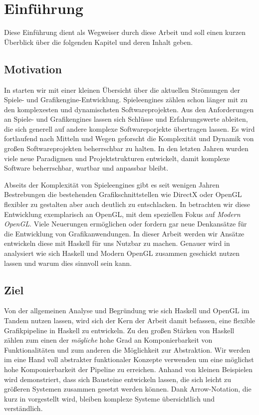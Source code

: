 \chapter{Einführung}

Diese Einführung dient als Wegweiser durch diese Arbeit und soll einen kurzen Überblick über die folgenden Kapitel und deren Inhalt geben.

\section{Motivation}
In  starten wir mit einer kleinen Übersicht über die aktuellen Strömungen der Spiele- und Grafikengine-Entwicklung. Spieleengines zählen schon länger mit zu den komplexesten und dynamischsten Softwareprojekten. Aus den Anforderungen an Spiele- und Grafikengines lassen sich Schlüsse und Erfahrungswerte ableiten, die sich generell auf andere komplexe Softwareporjekte übertragen lassen. Es wird fortlaufend nach Mitteln und Wegen geforscht die Komplexität und Dynamik von großen Softwareprojekten beherrschbar zu halten. In den letzten Jahren wurden viele neue Paradigmen und Projektstrukturen entwickelt, damit komplexe Software beherrschbar, wartbar und anpassbar bleibt.

Abseits der Komplexität von Spieleengines gibt es seit wenigen Jahren Bestrebungen die bestehenden Grafikschnittstellen wie DirectX oder OpenGL flexibler zu gestalten aber auch deutlich zu entschlacken. In  betrachten wir diese Entwicklung exemplarisch an OpenGL, mit dem speziellen Fokus auf \textit{Modern OpenGL}. Viele Neuerungen ermöglichen oder fordern gar neue Denkansätze für die Entwicklung von Grafikanwendungen. In dieser Arbeit werden wir Ansätze entwickeln diese mit Haskell für uns Nutzbar zu machen. Genauer wird in  analysiert wie sich Haskell und Modern OpenGL zusammen geschickt nutzen lassen und warum dies sinnvoll sein kann.

\section{Ziel}
Von der allgemeinen Analyse und Begründung wie sich Haskell und OpenGL im Tandem nutzen lassen, wird sich der Kern der Arbeit damit befassen, eine flexible Grafikpipeline in Haskell zu entwickeln. Zu den großen Stärken von Haskell zählen zum einen der \textit{mögliche} hohe Grad an Komponierbarkeit von Funktionalitäten und zum anderen die Möglichkeit zur Abstraktion. Wir werden im  eine Hand voll abstrakter funktionaler Konzepte verwenden um eine möglichst hohe Komponierbarkeit der Pipeline zu erreichen. Anhand von kleinen Beispielen wird demonstriert, dass sich Bausteine entwickeln lassen, die sich leicht zu größeren Systemen zusammen gesetzt werden können. Dank Arrow-Notation, die kurz in  vorgestellt wird, bleiben komplexe Systeme übersichtlich und verständlich.

